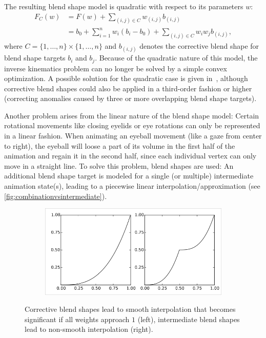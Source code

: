 The resulting blend shape model is quadratic with respect to its parameters \(w\):
\begin{align*}
  F_C(w)&=F(w)+\sum\limits_{(i,j)\in C}w_{(i,j)} b_{(i,j)}\\
      &=b_0+\sum\limits_{i=1}^{n}w_i(b_i-b_0)+\sum\limits_{(i,j)\in C}w_i w_j b_{(i,j)},
\end{align*}
where \(C=\{1,\dots,n\}\times\{1,\dots,n\}\) and \(b_{(i,j)}\) denotes the corrective blend shape for blend shape targets \(b_i\) and \(b_j\).
Because of the quadratic nature of this model,
the inverse kinematics problem can no longer be solved by a simple convex optimization.
A possible solution for the quadratic case is given in~\autocite{nonconvexblendshapes},
although corrective blend shapes could also be applied in a third-order fashion or higher (correcting anomalies caused by three or more overlapping blend shape targets).

Another problem arises from the linear nature of the blend shape model:
Certain rotational movements like closing eyelids or eye rotations can only be represented in a linear fashion.
When animating an eyeball movement (like a gaze from center to right),
the eyeball will loose a part of its volume in the first half of the animation and regain it in the second half,
since each individual vertex can only move in a straight line.
To solve this problem,  blend shapes are used:
An additional blend shape target is modeled for a single (or multiple) intermediate animation state(s),
leading to a piecewise linear interpolation/approximation (see \autoref{fig:combinationvsintermediate}).

\begin{figure}[h]
  \centering
  \begin{subfigure}[b]{0.45\textwidth}
	\includegraphics[scale=0.3]{img/combination_vs_intermediate.png}
  \end{subfigure}
  \caption{Corrective blend shapes lead to smooth interpolation that becomes significant if all weights approach \(1\) (left),
    intermediate blend shapes lead to non-smooth interpolation (right).~\autocite{practicetheoryblendshapes}
  }
  \label{fig:combinationvsintermediate}
\end{figure}

